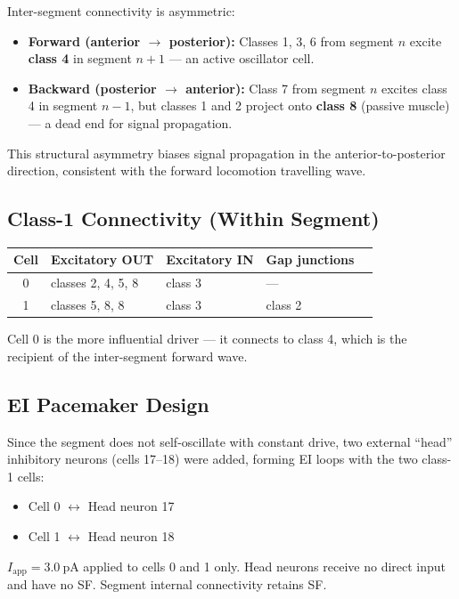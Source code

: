 \documentclass[11pt]{article}
\begin{document}
Inter-segment connectivity is asymmetric:
\begin{itemize}
  \item \textbf{Forward (anterior $\to$ posterior):} Classes 1, 3, 6 from segment $n$ excite \textbf{class 4} in segment $n+1$ --- an active oscillator cell.
  \item \textbf{Backward (posterior $\to$ anterior):} Class 7 from segment $n$ excites class 4 in segment $n-1$, but classes 1 and 2 project onto \textbf{class 8} (passive muscle) --- a dead end for signal propagation.
\end{itemize}
This structural asymmetry biases signal propagation in the anterior-to-posterior direction, consistent with the forward locomotion travelling wave.

\subsection{Class-1 Connectivity (Within Segment)}

\begin{center}
\begin{tabular}{@{}cllll@{}}
  \toprule
  Cell & Excitatory OUT & Excitatory IN & Gap junctions \\
  \midrule
  0 & classes 2, 4, 5, 8 & class 3 & --- \\
  1 & classes 5, 8, 8    & class 3 & class 2 \\
  \bottomrule
\end{tabular}
\end{center}

Cell 0 is the more influential driver --- it connects to class 4, which is the recipient of the inter-segment forward wave.

\subsection{EI Pacemaker Design}

Since the segment does not self-oscillate with constant drive, two external ``head'' inhibitory neurons (cells 17--18) were added, forming EI loops with the two class-1 cells:
\begin{itemize}
  \item Cell 0 $\leftrightarrow$ Head neuron 17
  \item Cell 1 $\leftrightarrow$ Head neuron 18
\end{itemize}
$I_\text{app} = 3.0\ \text{pA}$ applied to cells 0 and 1 only. Head neurons receive no direct input and have no SF. Segment internal connectivity retains SF.
\end{document}
